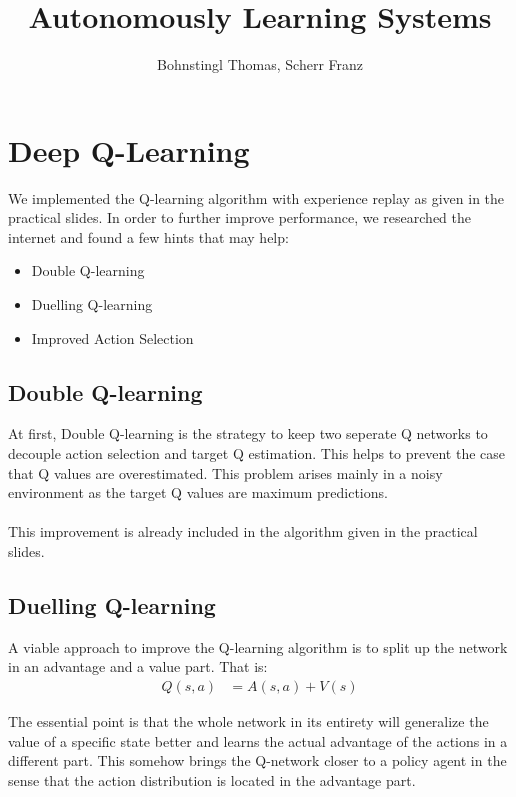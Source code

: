 \documentclass[10pt,a4paper]{article}
\author{Bohnstingl Thomas, Scherr Franz}
\title{Autonomously Learning Systems}
\begin{document}
\newcommand{\identity}{\mathbf{I}}
\newcommand{\Xmat}{\mathbf{X}}
\newcommand{\yvec}{\mathbf{y}}
\renewcommand{\th}{\theta}
\newcommand{\dthi}{\frac{\partial}{\partial \th_i}}
\newcommand{\dthj}{\frac{\partial}{\partial \th_j}}
\section{Deep Q-Learning}

We implemented the Q-learning algorithm with experience replay as given in the practical slides. In order to further improve performance, we researched the internet and found a few hints that may help:

\begin{itemize}
  \item Double Q-learning
  \item Duelling Q-learning
  \item Improved Action Selection
\end{itemize}

\subsection{Double Q-learning}
At first, Double Q-learning is the strategy to keep two seperate Q networks to decouple action selection and target Q estimation. This helps to prevent the case that Q values are overestimated. This problem arises mainly in a noisy environment as the target Q values are maximum predictions. \\
\\
This improvement is already included in the algorithm given in the practical slides.

\subsection{Duelling Q-learning}
A viable approach to improve the Q-learning algorithm is to split up the network in an advantage and a value part. That is:
\begin{align*}
  Q(s, a) &= A(s, a) + V(s)
\end{align*}

The essential point is that the whole network in its entirety will generalize the value of a specific state better and learns the actual advantage of the actions in a different part. This somehow brings the Q-network closer to a policy agent in the sense that the action distribution is located in the advantage part.
\end{document}
